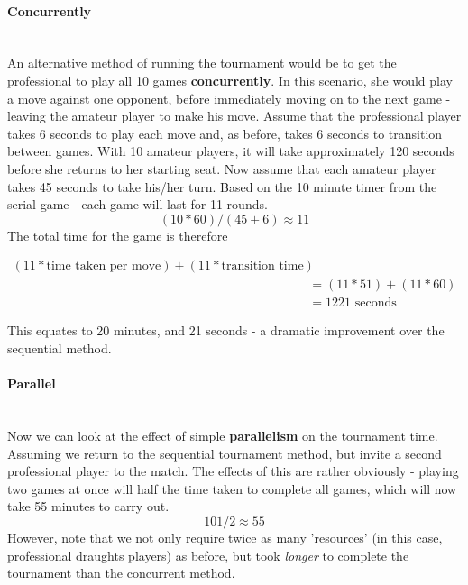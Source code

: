 \paragraph{Concurrently} \mbox{}\\

An alternative method of running the tournament would be to get the professional
to play all 10 games \textbf{concurrently}. In this scenario, she would play
a move against one opponent, before immediately moving on to the next game -
leaving the amateur player to make his move. Assume that the professional player
takes 6 seconds to play each move and, as before, takes 6 seconds to transition
between games. With 10 amateur players, it will take approximately 120 seconds
before she returns to her starting seat. Now assume that each amateur player
takes 45 seconds to take his/her turn. Based on the 10 minute timer from the
serial game - each game will last for 11 rounds.
$$(10 * 60) / (45 + 6) \approx 11$$
The total time for the game is therefore

\begin{equation}
  \begin{split}
    (11 * \text{time taken per move}) + (11 * \text{transition time}) \\
    &= (11 * 51) + (11 * 60) \\
    &= 1221 \text{ seconds}
  \end{split}
\end{equation}

This equates to 20 minutes, and 21 seconds - a dramatic improvement over the
sequential method. \\

\paragraph{Parallel} \mbox{}\\

Now we can look at the effect of simple \textbf{parallelism} on the tournament
time. Assuming we return to the sequential tournament method, but invite a
second professional player to the match. The effects of this are rather
obviously - playing two games at once will half the time taken to complete all
games, which will now take 55 minutes to carry out. $$101/2 \approx 55$$
However, note that we not only require twice as many 'resources' (in this case,
professional draughts players) as before, but took \emph{longer} to complete the
tournament than the concurrent method. \\

